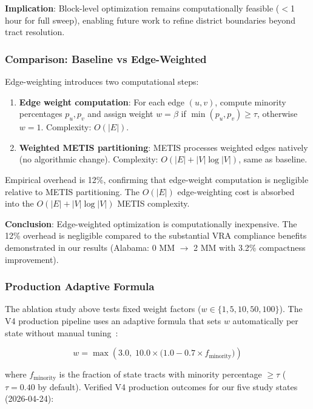 \textbf{Implication}: Block-level optimization remains computationally feasible ($<$1 hour for full sweep), enabling future work to refine district boundaries beyond tract resolution.

\subsubsection{Comparison: Baseline vs Edge-Weighted}

Edge-weighting introduces two computational steps:
\begin{enumerate}
    \item \textbf{Edge weight computation}: For each edge $(u, v)$, compute minority percentages $p_u, p_v$ and assign weight $w = \beta$ if $\min(p_u, p_v) \geq \tau$, otherwise $w = 1$. Complexity: $O(|E|)$.
    \item \textbf{Weighted METIS partitioning}: METIS processes weighted edges natively (no algorithmic change). Complexity: $O(|E| + |V|\log|V|)$, same as baseline.
\end{enumerate}

Empirical overhead is 12\%, confirming that edge-weight computation is negligible relative to METIS partitioning. The $O(|E|)$ edge-weighting cost is absorbed into the $O(|E| + |V|\log|V|)$ METIS complexity.

\textbf{Conclusion}: Edge-weighted optimization is computationally inexpensive. The 12\% overhead is negligible compared to the substantial VRA compliance benefits demonstrated in our results (Alabama: 0 MM $\rightarrow$ 2 MM with 3.2\% compactness improvement).

\subsubsection{Production Adaptive Formula}

The ablation study above tests fixed weight factors ($w \in \{1, 5, 10, 50, 100\}$). The V4 production pipeline uses an adaptive formula that sets $w$ automatically per state without manual tuning~\citep{dellaLibera2026D0}:

\begin{equation}
w = \max\!\left(3.0,\; 10.0 \times \bigl(1.0 - 0.7 \times f_{\text{minority}}\bigr)\right)
\label{eq:adaptive_boost_d3}
\end{equation}

where $f_{\text{minority}}$ is the fraction of state tracts with minority percentage $\geq \tau$ ($\tau = 0.40$ by default). Verified V4 production outcomes for our five study states (2026-04-24):

